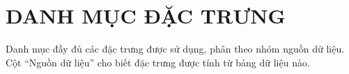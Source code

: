 

\chapter{DANH MỤC ĐẶC TRƯNG}
\label{app:features}

Danh mục đầy đủ các đặc trưng được sử dụng, phân theo nhóm nguồn dữ liệu. Cột
``Nguồn dữ liệu'' cho biết đặc trưng được tính từ bảng dữ liệu nào.



